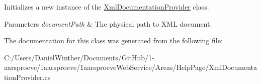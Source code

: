 Initializes a new instance of the \hyperlink{class__1aarsproeve_web_service_1_1_areas_1_1_help_page_1_1_xml_documentation_provider}{Xml\+Documentation\+Provider} class. 


\begin{DoxyParams}{Parameters}
{\em document\+Path} & The physical path to X\+M\+L document.\\
\hline
\end{DoxyParams}


The documentation for this class was generated from the following file\+:\begin{DoxyCompactItemize}
\item 
C\+:/\+Users/\+Daniel\+Winther/\+Documents/\+Git\+Hub/1-\/aarsproeve/1aarsproeve/1aarsproeve\+Web\+Service/\+Areas/\+Help\+Page/Xml\+Documentation\+Provider.\+cs\end{DoxyCompactItemize}
